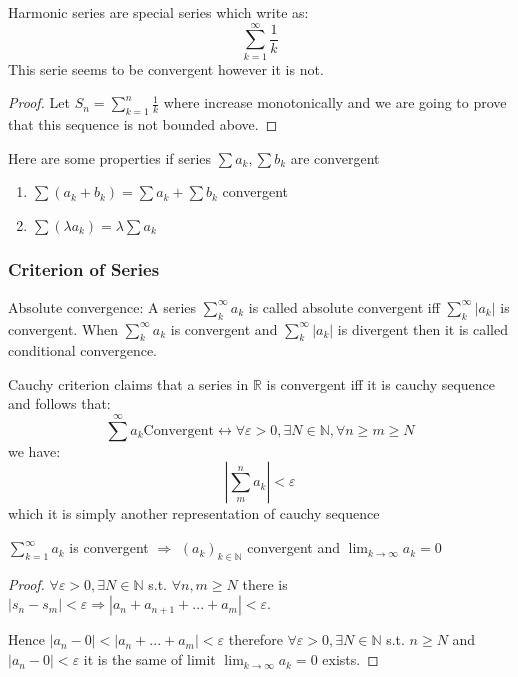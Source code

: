 \documentclass{article}
\newcommand{\N}{\mathbb{N}}
\newcommand{\R}{\mathbb{R}}
\begin{document}
\begin{example}
Harmonic series are special series which write as:
\begin{equation*}
	\sum_{k=1}^\infty \frac{1}{k}
\end{equation*}	
This serie seems to be convergent however it is not.
\end{example}

\begin{proof}
	Let $S_n=\sum_{k=1}^n \frac{1}{k}$ where increase monotonically and we are going to prove that this sequence is not bounded above. 
\end{proof}

Here are some properties if series $\sum a_k, \sum b_k$ are convergent
\begin{enumerate}
	\item $\sum(a_k+b_k)=\sum a_k  +\sum b_k$ convergent
	\item $\sum (\lambda a_k)=\lambda \sum a_k$
\end{enumerate}


\subsubsection{Criterion of Series}
\begin{definition}
	Absolute convergence: A series $\sum_k^{\infty}a_k$ is called absolute convergent iff $\sum_k^{\infty}|a_k|$ is convergent. When $\sum_k^{\infty}a_k$ is convergent and $\sum_k^{\infty}|a_k|$ is divergent then it is called conditional convergence.
\end{definition}


\begin{theorem}
	Cauchy criterion claims that a series in $\R$ is convergent iff it is cauchy sequence and follows that:
	\begin{equation*}
	\sum^\infty a_k \text{Convergent} \leftrightarrow \forall \varepsilon >0, \exists N\in \N, \forall n\geq m\geq N
	\end{equation*}
	we have:
	\begin{equation*}
		|\sum_m^n a_k|<\varepsilon
	\end{equation*}
	which it is simply another representation of cauchy sequence
\end{theorem}

\begin{theorem}
	$\sum_{k=1}^\infty a_k$ is convergent $\Rightarrow$ $(a_k)_{k\in \N}$ convergent and $\lim_{k\to \infty}a_k=0$
\end{theorem}
\begin{proof}
	$\forall \varepsilon >0,\exists
	N\in \N$ s.t. $\forall n,m\geq N$ there is $|s_n-s_m|<\varepsilon \Rightarrow |a_n+a_{n+1}+...+a_m|<\varepsilon$.
	
	Hence $|a_n-0|<|a_n+...+a_m|<\varepsilon$ therefore $\forall \varepsilon >0,\exists
	N\in \N$ s.t. $n\geq N$ and $|a_n-0|<\varepsilon$ it is the same of limit $\lim_{k\to \infty}a_k=0$ exists.
\end{proof}
\end{document}
